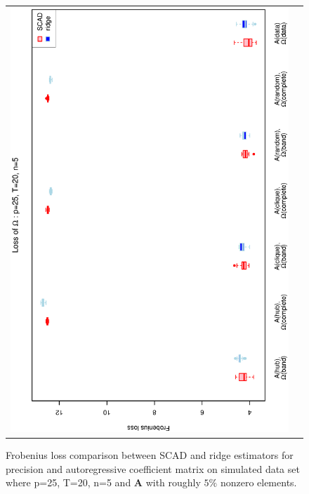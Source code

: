 \begin{figure}[h!]
\begin{tabular}{cc}
\includegraphics[scale=0.45,angle=270]{LossOmega25T20N5_5.eps}
\end{tabular}
\caption{Frobenius loss comparison between SCAD and ridge estimators for precision and autoregressive coefficient matrix on simulated data set where p=25, T=20, n=5  and $\mathbf{A}$ with roughly $5\%$ nonzero elements.}
\label{figSM:Loss25T20N5_5}
\end{figure}


